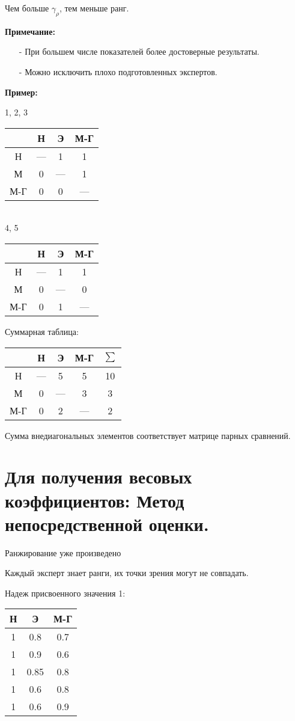 \documentclass[12pt,a5paper]{scrbook}
\begin{document}
  Чем больше $\gamma_\rho$, тем меньше ранг.

  \textbf{Примечание:}
  \begin{itemize}
    \item[-] При большем числе показателей более достоверные результаты.
    \item[-] Можно исключить плохо подготовленных экспертов.
  \end{itemize}

  \textbf{Пример:}

  1, 2, 3

  \begin{tabular}{c|c|c|c}
    & Н & Э & М-Г\\
    \hline
    Н & --- & 1 & 1\\
    М & 0 & --- & 1\\
    М-Г & 0 & 0 & ---
  \end{tabular}\\

  4, 5

  \begin{tabular}{c|c|c|c}
    & Н & Э & М-Г\\
    \hline
    Н & --- & 1 & 1\\
    М & 0 & --- & 0\\
    М-Г & 0 & 1 & ---
  \end{tabular}

  Суммарная таблица:

  \begin{tabular}{c|c|c|c|c}
    & Н & Э & М-Г & $\sum$\\
    \hline
    Н & --- & 5 & 5 & 10\\
    М & 0 & --- & 3 & 3\\
    М-Г & 0 & 2 & --- & 2
  \end{tabular}

  Сумма внедиагональных элементов соответствует матрице парных сравнений.

  \section{Для получения весовых коэффициентов: Метод непосредственной оценки.}

  Ранжирование уже произведено

  Каждый эксперт знает ранги, их точки зрения могут не совпадать.

  Надеж присвоенного значения 1:

  \begin{tabular}{c|c|c}
    Н & Э & М-Г\\
    \hline
    1 & 0.8 & 0.7\\
    1 & 0.9 & 0.6\\
    1 & 0.85 & 0.8\\
    1 & 0.6 & 0.8\\
    1 & 0.6 & 0.9
  \end{tabular}
\end{document}
